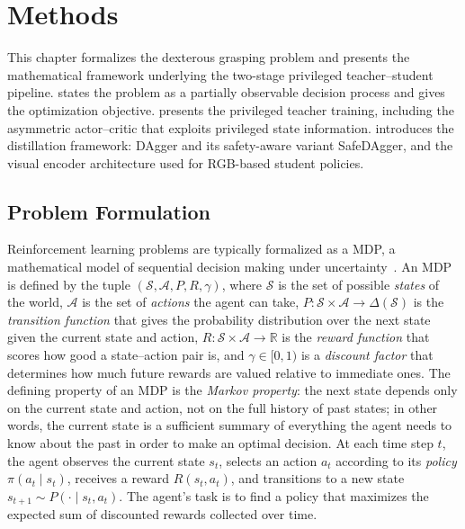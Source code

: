 \chapter{Methods}%
\label{ch:methods}%

This chapter formalizes the dexterous grasping problem and presents the mathematical framework underlying the two-stage privileged teacher--student pipeline.
 states the problem as a partially observable decision process and gives the optimization objective.
 presents the privileged teacher training, including the asymmetric actor--critic that exploits privileged state information.
 introduces the distillation framework: DAgger and its safety-aware variant SafeDAgger, and the visual encoder architecture used for RGB-based student policies.

\section{Problem Formulation}%
\label{sec:problem_formulation}%

Reinforcement learning problems are typically formalized as a \ac{MDP}, a mathematical model of sequential decision making under uncertainty~\cite{SuttonBarto2018}.
An \ac{MDP} is defined by the tuple $(\mathcal{S}, \mathcal{A}, P, R, \gamma)$, where $\mathcal{S}$ is the set of possible \emph{states} of the world, $\mathcal{A}$ is the set of \emph{actions} the agent can take, $P : \mathcal{S} \times \mathcal{A} \to \Delta(\mathcal{S})$ is the \emph{transition function} that gives the probability distribution over the next state given the current state and action, $R : \mathcal{S} \times \mathcal{A} \to \mathbb{R}$ is the \emph{reward function} that scores how good a state--action pair is, and $\gamma \in [0,1)$ is a \emph{discount factor} that determines how much future rewards are valued relative to immediate ones.
The defining property of an \ac{MDP} is the \emph{Markov property}: the next state depends only on the current state and action, not on the full history of past states; in other words, the current state is a sufficient summary of everything the agent needs to know about the past in order to make an optimal decision.
At each time step $t$, the agent observes the current state $s_t$, selects an action $a_t$ according to its \emph{policy} $\pi(a_t \mid s_t)$, receives a reward $R(s_t, a_t)$, and transitions to a new state $s_{t+1} \sim P(\cdot \mid s_t, a_t)$.
The agent's task is to find a policy that maximizes the expected sum of discounted rewards collected over time.

